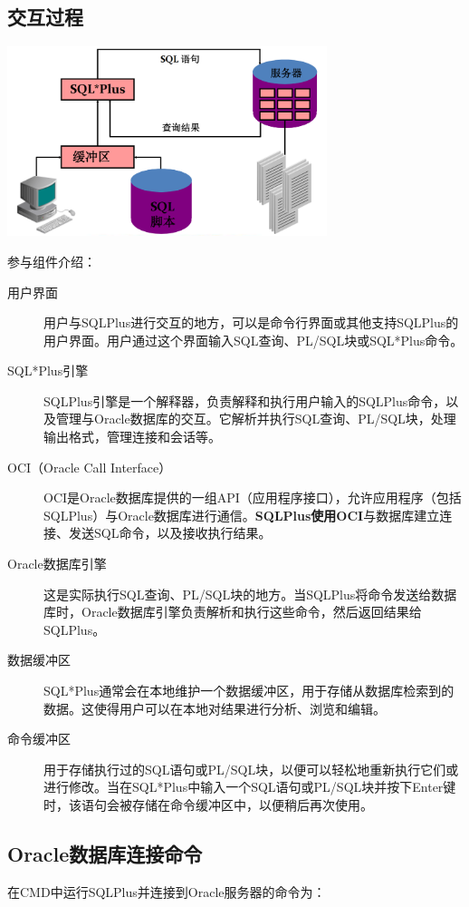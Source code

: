 \documentclass[11pt, a4paper, oneside, UTF8]{ctexbook}
\begin{document}
\subsection{交互过程}
\begin{center}
  \begin{minipage}{\textwidth}
    \center
    \includegraphics[width=0.7\textwidth]{picture/SQLPLUS交互.png}
    \captionsetup{hypcap=false}
    \label{fig:SQLPLUS交互}
  \end{minipage}
\end{center}
参与组件介绍：
\begin{description}
  \item[用户界面] 用户与SQLPlus进行交互的地方，可以是命令行界面或其他支持SQLPlus的用户界面。用户通过这个界面输入SQL查询、PL/SQL块或SQL*Plus命令。
  \item[SQL*Plus引擎] SQLPlus引擎是一个解释器，负责解释和执行用户输入的SQLPlus命令，以及管理与Oracle数据库的交互。它解析并执行SQL查询、PL/SQL块，处理输出格式，管理连接和会话等。
  \item[OCI（Oracle Call Interface）] OCI是Oracle数据库提供的一组API（应用程序接口），允许应用程序（包括SQLPlus）与Oracle数据库进行通信。\textbf{SQLPlus使用OCI}与数据库建立连接、发送SQL命令，以及接收执行结果。
  \item[Oracle数据库引擎] 这是实际执行SQL查询、PL/SQL块的地方。当SQLPlus将命令发送给数据库时，Oracle数据库引擎负责解析和执行这些命令，然后返回结果给SQLPlus。
  \item[数据缓冲区] SQL*Plus通常会在本地维护一个数据缓冲区，用于存储从数据库检索到的数据。这使得用户可以在本地对结果进行分析、浏览和编辑。
  \item[命令缓冲区] 用于存储执行过的SQL语句或PL/SQL块，以便可以轻松地重新执行它们或进行修改。当在SQL*Plus中输入一个SQL语句或PL/SQL块并按下Enter键时，该语句会被存储在命令缓冲区中，以便稍后再次使用。
\end{description}
\subsection{Oracle数据库连接命令}
在CMD中运行SQLPlus并连接到Oracle服务器的命令为：
\end{document}
